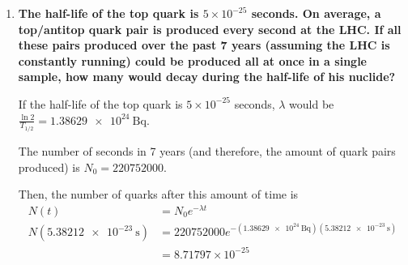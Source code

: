 \documentclass[11pt]{article}
\begin{document}
\begin{enumerate}[label=\textbf{\arabic*.}, start=3]
{\begin{enumerate}[label=\textbf{(\alph*)}]
{                    \begin{align*}
                        \SI{2.5715e34}{\becquerel}&=\lambda\cdot1.99670\times10^{12} \\
                        \lambda&=\SI{1.28787e22}{\becquerel}
                    \end{align*}
                    Finding the half-life:
                    \begin{align*}
                        T_{1/2}&=\frac{\ln 2}{\lambda} \\
                        &=\SI{5.38212e-23}{\second}
                    \end{align*}
                }
                \item{
                    \textbf{\boldmath The half-life of the top quark is \(5\times10^{-25}\) seconds. On average, a top/antitop quark pair is produced every second at the LHC. If all these pairs produced over the past 7 years (assuming the LHC is constantly running) could be produced all at once in a single sample, how many would decay during the half-life of his nuclide?}
                    \par
                    If the half-life of the top quark is \(5\times10^{-25}\) seconds, \(\lambda\) would be \(\frac{\ln 2}{T_{1/2}}=\SI{1.38629e24}{\becquerel}\).
                    \par
                    The number of seconds in 7 years (and therefore, the amount of quark pairs produced) is \(N_0=220752000\).
                    \par
                    Then, the number of quarks after this amount of time is
                    \begin{align*}
                        N(t)&=N_0e^{-\lambda t} \\
                        N(\SI{5.38212e-23}{\second})&=220752000e^{-(\SI{1.38629e24}{\becquerel})(\SI{5.38212e-23}{\second})} \\
                        &=8.71797\times10^{-25}
                    \end{align*}
                }
            \end{enumerate}
        }
    \end{enumerate}
\end{document}
